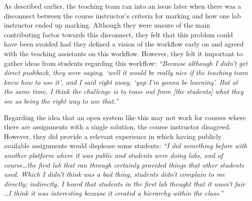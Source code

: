 
As described earlier, the teaching team ran into an issue later when there was a disconnect between the course instructor's criteria for marking and how one lab instructor ended up marking. Although they were unsure of the main contributing factor towards this disconnect, they felt that this problem could have been avoided had they defined a vision of the workflow early on and agreed with the teaching assistants on this workflow. However, they felt it important to gather ideas from students regarding this workflow: \textit{``Because although I didn't get direct pushback, they were saying, `well it would be really nice if the teaching team knew how to use it', and I said right away, `yup I'm gonna be learning'. But at the same time, I think the challenge is to tease out from [the students] what they see as being the right way to use that.''}


Regarding the idea that an open system like this may not work for courses where there are assignments with a single solution, the course instructor disagreed. However, they did provide a relevant experience in which having publicly available assignments would displease some students: \textit{``I did something before with another platform where it was public and students were doing labs, and of course\ldots the first lab that ran through certainly provided things that other students used. Which I didn't think was a bad thing, students didn't complain to me directly; indirectly, I heard that students in the first lab thought that it wasn't fair \ldots I think it was interesting because it created a hierarchy within the class.''}


